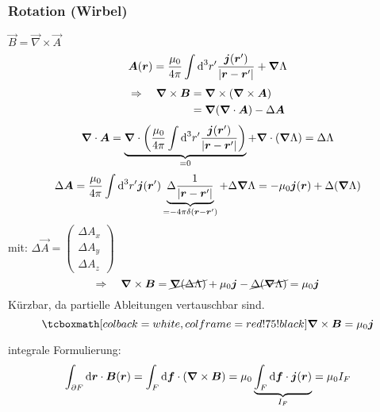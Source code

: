 \subsubsection{Rotation (Wirbel)}

$ \vec{B} = \vec{\nabla} \times \vec{A} $
\begin{equation*}
\bm{A}(\bm{r}) = \frac{\mu_0}{4 \pi} \int \textrm{d}^3 r' \frac{\bm{j}(\bm{r}')}{|\bm{r} - \bm{r}'|} + \bm{\nabla} \Lambda
\end{equation*}
\begin{align*}
\Rightarrow \quad \bm{\nabla} \times \bm{B} &= \bm{\nabla} \times (\bm{\nabla} \times \bm{A})\\
&= \bm{\nabla} (\bm{\nabla} \cdot \bm{A}) - \Delta \bm{A}
\end{align*}
\begin{equation*}
\bm{\nabla} \cdot \bm{A} = \underbrace{\bm{\nabla} \cdot \left(\frac{\mu_0}{4 \pi} \int \textrm{d} ^3 r' \frac{\bm{j}(\bm{r}')}{|\bm{r} - \bm{r}'|}\right)}_{=0} + \bm{\nabla} \cdot (\bm{\nabla} \Lambda) = \Delta \Lambda 
\end{equation*}
\begin{equation*}
\Delta \bm{A} = \frac{\mu_0}{4 \pi} \int \textrm{d}^3 r' \bm{j}(\bm{r}') \underbrace{\Delta \frac{1}{|\bm{r} - \bm{r}'|}}_{= - 4 \pi \delta(\bm{r} - \bm{r}')} + \Delta \bm{\nabla} \Lambda = - \mu_0 \bm{j}(\bm{r}) + \Delta (\bm{\nabla} \Lambda)
\end{equation*}
mit: $ \Delta \vec{A} = \begin{pmatrix}
\Delta A_x \\ \Delta A_y \\ \Delta A_z
\end{pmatrix} $
\begin{equation*}
\Rightarrow \quad \bm{\nabla} \times \bm{B} = \cancel{\bm{\nabla}(\Delta \Lambda)} + \mu_0 \bm{j} - \cancel{\Delta (\bm{\nabla} \Lambda)} = \mu_0 \bm{j}
\end{equation*}
Kürzbar, da partielle Ableitungen vertauschbar sind.
\begin{equation*}
\rmbox{\vabla \times \vec{B} = \mu_0 \vec{j}}
\end{equation*}
\begin{minipage}{.8\linewidth}
	integrale Formulierung:
	\begin{equation*}
	\int_{\partial F} \textrm{d} \bm{r} \cdot \bm{B} (\bm{r}) = \int_F \textrm{d} \bm{f} \cdot (\bm{\nabla} \times \bm{B}) = \mu_0 \underbrace{\int_F \textrm{d} \bm{f} \cdot \bm{j}(\bm{r})}_{I_F} = \mu_0 I_F
	\end{equation*}
\end{minipage}%
